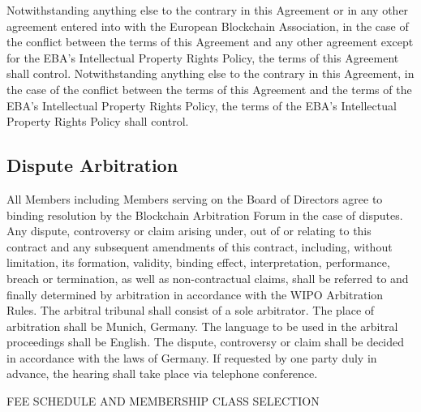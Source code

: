 \documentclass{article}
\begin{document}
Notwithstanding anything else to the contrary in this Agreement or in any other agreement entered into with the European Blockchain Association, in the case of the conflict between the terms of this Agreement and any other agreement except for the EBA’s Intellectual Property Rights Policy, the terms of this Agreement shall control. 
Notwithstanding anything else to the contrary in this Agreement, in the case of the conflict between the terms of this Agreement and the terms of the EBA’s Intellectual Property Rights Policy, the terms of the EBA’s Intellectual Property Rights Policy shall control.

\subsection{Dispute Arbitration}

All Members including Members serving on the Board of Directors agree to binding resolution by the Blockchain Arbitration Forum in the case of disputes.
 Any dispute, controversy or claim arising under, out of or relating to this contract and any subsequent amendments of this contract, including, without limitation, its formation, validity, binding effect, interpretation, performance, breach or termination, as well as non-contractual claims, shall be referred to and finally determined by arbitration in accordance with the WIPO Arbitration Rules. 
 The arbitral tribunal shall consist of a sole arbitrator. 
 The place of arbitration shall be Munich, Germany.
  The language to be used in the arbitral proceedings shall be English. 
  The dispute, controversy or claim shall be decided in accordance with the laws of Germany. 
  If requested by one party duly in advance, the hearing shall take place via telephone conference.
 

\newpage

{\scshape\LARGE FEE SCHEDULE AND MEMBERSHIP CLASS SELECTION \centering \par}
\end{document}
